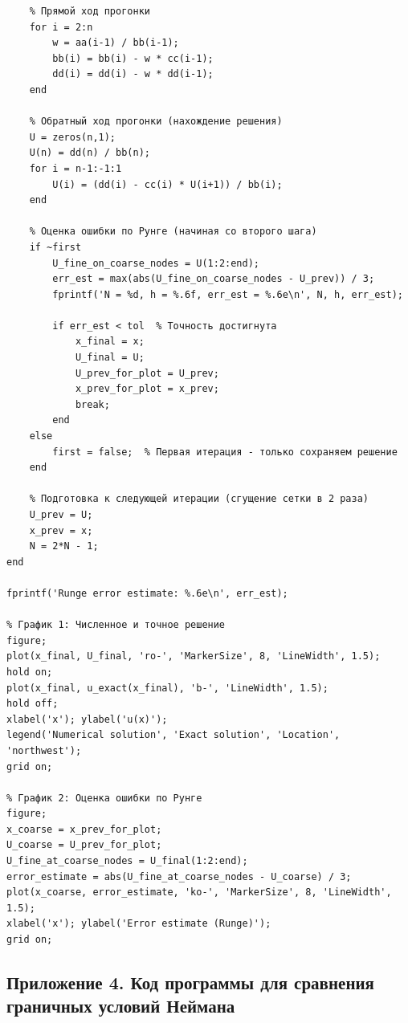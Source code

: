 \documentclass[14pt,a4paper]{extarticle}  %
\numberwithin{equation}{section}
\begin{document}
\begin{verbatim}
    % Прямой ход прогонки
    for i = 2:n
        w = aa(i-1) / bb(i-1);
        bb(i) = bb(i) - w * cc(i-1);
        dd(i) = dd(i) - w * dd(i-1);
    end

    % Обратный ход прогонки (нахождение решения)
    U = zeros(n,1);
    U(n) = dd(n) / bb(n);
    for i = n-1:-1:1
        U(i) = (dd(i) - cc(i) * U(i+1)) / bb(i);
    end

    % Оценка ошибки по Рунге (начиная со второго шага)
    if ~first
        U_fine_on_coarse_nodes = U(1:2:end);
        err_est = max(abs(U_fine_on_coarse_nodes - U_prev)) / 3;
        fprintf('N = %d, h = %.6f, err_est = %.6e\n', N, h, err_est);

        if err_est < tol  % Точность достигнута
            x_final = x;
            U_final = U;
            U_prev_for_plot = U_prev;
            x_prev_for_plot = x_prev;
            break;
        end
    else
        first = false;  % Первая итерация - только сохраняем решение
    end

    % Подготовка к следующей итерации (сгущение сетки в 2 раза)
    U_prev = U;
    x_prev = x;
    N = 2*N - 1;
end

fprintf('Runge error estimate: %.6e\n', err_est);

% График 1: Численное и точное решение
figure;
plot(x_final, U_final, 'ro-', 'MarkerSize', 8, 'LineWidth', 1.5);
hold on;
plot(x_final, u_exact(x_final), 'b-', 'LineWidth', 1.5);
hold off;
xlabel('x'); ylabel('u(x)');
legend('Numerical solution', 'Exact solution', 'Location', 'northwest');
grid on;

% График 2: Оценка ошибки по Рунге
figure;
x_coarse = x_prev_for_plot;
U_coarse = U_prev_for_plot;
U_fine_at_coarse_nodes = U_final(1:2:end);
error_estimate = abs(U_fine_at_coarse_nodes - U_coarse) / 3;
plot(x_coarse, error_estimate, 'ko-', 'MarkerSize', 8, 'LineWidth', 1.5);
xlabel('x'); ylabel('Error estimate (Runge)');
grid on;
\end{verbatim}

\subsection*{Приложение 4. Код программы для сравнения граничных условий Неймана}
\label{app:neumann_comparison}
\end{document}
